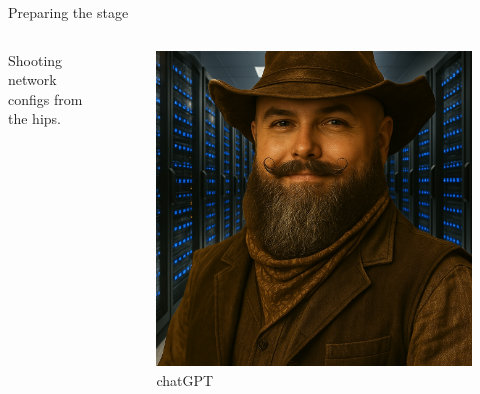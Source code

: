 \documentclass[aspectratio=169]{beamer}
\begin{document}
\begin{frame}{Preparing the stage}

  \begin{columns}
    \begin{column}{0.4\textwidth}
      Shooting network configs from the hips.
    \end{column}
    \begin{column}{0.4\textwidth}
      \begin{figure}
        \includegraphics[height = 0.7\textheight]{images/urs_cli_cowboy.png}
        \caption{\footnotesize chatGPT}
      \end{figure}
    \end{column}
  \end{columns}

\end{frame}
\end{document}
